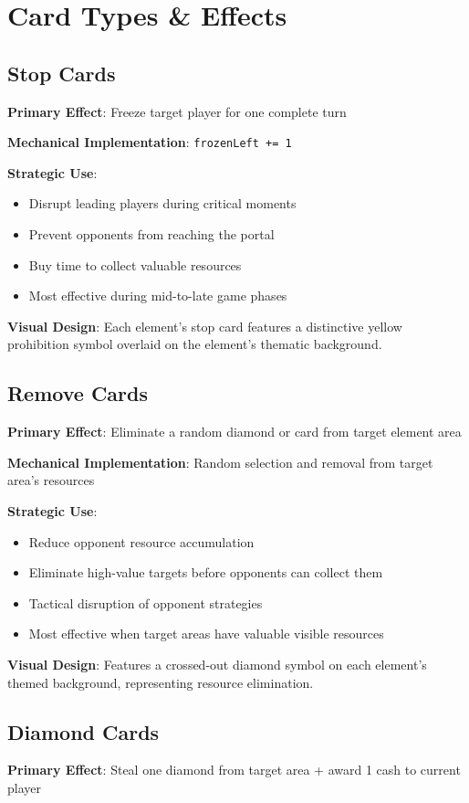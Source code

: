\documentclass[12pt,a4paper]{article}
\begin{document}
\section{Card Types \& Effects}

\subsection{Stop Cards}
\textbf{Primary Effect}: Freeze target player for one complete turn

\textbf{Mechanical Implementation}: \texttt{frozenLeft += 1}

\textbf{Strategic Use}:
\begin{itemize}
    \item Disrupt leading players during critical moments
    \item Prevent opponents from reaching the portal
    \item Buy time to collect valuable resources
    \item Most effective during mid-to-late game phases
\end{itemize}

\textbf{Visual Design}: Each element's stop card features a distinctive yellow prohibition symbol overlaid on the element's thematic background.

\subsection{Remove Cards}
\textbf{Primary Effect}: Eliminate a random diamond or card from target element area

\textbf{Mechanical Implementation}: Random selection and removal from target area's resources

\textbf{Strategic Use}:
\begin{itemize}
    \item Reduce opponent resource accumulation
    \item Eliminate high-value targets before opponents can collect them
    \item Tactical disruption of opponent strategies
    \item Most effective when target areas have valuable visible resources
\end{itemize}

\textbf{Visual Design}: Features a crossed-out diamond symbol on each element's themed background, representing resource elimination.

\subsection{Diamond Cards}
\textbf{Primary Effect}: Steal one diamond from target area + award 1 cash to current player
\end{document}
